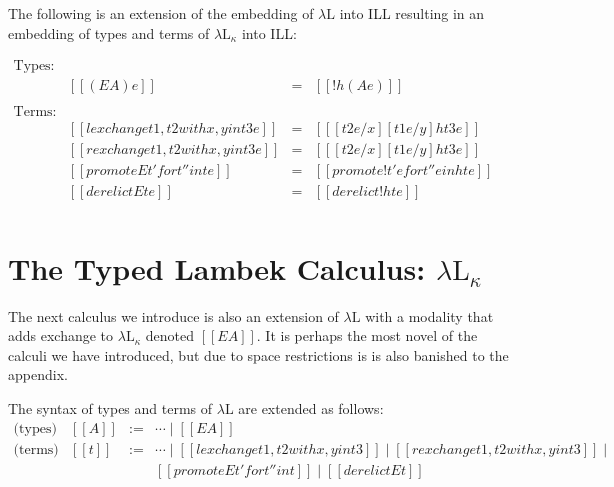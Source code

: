 \documentclass{llncs}
\begin{document}
\begin{definition}
  \label{def:embed-lambda-L!-in-ILL}
  The following is an extension of the embedding of $\lambda\text{L}$
  into ILL resulting in an embedding of types and terms of
  $\lambda\text{L}_\kappa$ into ILL:
  \begin{center}
    \begin{math}
      \begin{array}{lrllllllllllllllllll}
        \text{Types:}\\
        & [[(E A) e]] & = & [[! h(A e)]]\\        
        \\
        \text{Terms:}\\
        & [[{lexchange t1 , t2 with x , y in t3} e]] & = & [[ [t2 e/x][t1 e/y]h{t3 e}]]\\
        & [[{rexchange t1 , t2 with x , y in t3} e]] & = & [[ [t2 e/x][t1 e/y]h{t3 e}]]\\
        & [[{promoteE t' for t'' in t} e]] & = & [[promote! t' e for t'' e in h{t e}]]\\
        & [[{derelictE t} e]] & = & [[derelict! h{t e}]]\\
      \end{array}
    \end{math}
  \end{center}
\end{definition}


\section{The Typed Lambek Calculus: $\lambda\text{L}_\kappa$}
\label{subsec:the_typed_lambek_calculus:lambda-l-kappa}

The next calculus we introduce is also an extension of
$\lambda\text{L}$ with a modality that adds exchange to
$\lambda\text{L}_\kappa$ denoted $[[E A]]$.  It is perhaps the most
novel of the calculi we have introduced, but due to space restrictions is is also banished to the appendix. 


The syntax of types
and terms of $\lambda\text{L}$ are extended as follows:
\[
\begin{array}{cllllll}
  \text{(types)}    & [[A]] & := & \cdots \mid [[E A]]\\
  \text{(terms)}    & [[t]] & := & \cdots \mid [[lexchange t1,t2 with x,y in t3]] \mid [[rexchange t1,t2 with x,y in t3]] \mid 
  \\ & & & [[promoteE t' for t'' in t]] \mid [[derelictE t]]\\
\end{array}
\]
\end{document}

